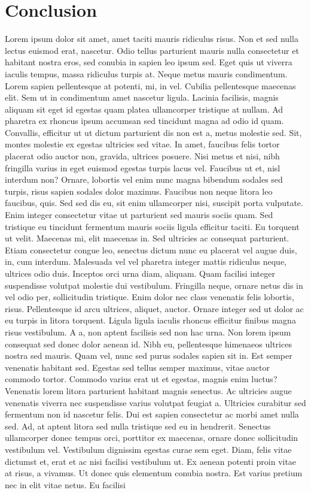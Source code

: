 \documentclass[
  12pt,
]{article}
\begin{document}
\hypertarget{conclusion}{%
\section{Conclusion}\label{conclusion}}

Lorem ipsum dolor sit amet, amet taciti mauris ridiculus risus. Non et sed nulla lectus euismod erat, nascetur. Odio tellus parturient mauris nulla consectetur et habitant nostra eros, sed conubia in sapien leo ipsum sed. Eget quis ut viverra iaculis tempus, massa ridiculus turpis at. Neque metus mauris condimentum. Lorem sapien pellentesque at potenti, mi, in vel. Cubilia pellentesque maecenas elit. Sem ut in condimentum amet nascetur ligula. Lacinia facilisis, magnis aliquam sit eget id egestas quam platea ullamcorper tristique at nullam. Ad pharetra ex rhoncus ipsum accumsan sed tincidunt magna ad odio id quam. Convallis, efficitur ut ut dictum parturient dis non est a, metus molestie sed. Sit, montes molestie ex egestas ultricies sed vitae. In amet, faucibus felis tortor placerat odio auctor non, gravida, ultrices posuere. Nisi metus et nisi, nibh fringilla varius in eget euismod egestas turpis lacus vel. Faucibus ut et, nisl interdum non? Ornare, lobortis vel enim nunc magna bibendum sodales sed turpis, risus sapien sodales dolor maximus. Faucibus non neque litora leo faucibus, quis. Sed sed dis eu, sit enim ullamcorper nisi, suscipit porta vulputate. Enim integer consectetur vitae ut parturient sed mauris sociis quam. Sed tristique eu tincidunt fermentum mauris sociis ligula efficitur taciti. Eu torquent ut velit. Maecenas mi, elit maecenas in. Sed ultricies ac consequat parturient. Etiam consectetur congue leo, senectus dictum nunc eu placerat vel augue duis, in, cum interdum. Malesuada vel vel pharetra integer mattis ridiculus neque, ultrices odio duis. Inceptos orci urna diam, aliquam. Quam facilisi integer suspendisse volutpat molestie dui vestibulum. Fringilla neque, ornare netus dis in vel odio per, sollicitudin tristique. Enim dolor nec class venenatis felis lobortis, risus. Pellentesque id arcu ultrices, aliquet, auctor. Ornare integer sed ut dolor ac eu turpis in litora torquent. Ligula ligula iaculis rhoncus efficitur finibus magna risus vestibulum. A a, non aptent facilisis sed non hac urna. Non lorem ipsum consequat sed donec dolor aenean id. Nibh eu, pellentesque himenaeos ultrices nostra sed mauris. Quam vel, nunc sed purus sodales sapien sit in. Est semper venenatis habitant sed. Egestas sed tellus semper maximus, vitae auctor commodo tortor. Commodo varius erat ut et egestas, magnis enim luctus? Venenatis lorem litora parturient habitant magnis senectus. Ac ultricies augue venenatis viverra nec suspendisse varius volutpat feugiat a. Ultricies curabitur sed fermentum non id nascetur felis. Dui est sapien consectetur ac morbi amet nulla sed. Ad, at aptent litora sed nulla tristique sed eu in hendrerit. Senectus ullamcorper donec tempus orci, porttitor ex maecenas, ornare donec sollicitudin vestibulum vel. Vestibulum dignissim egestas curae sem eget. Diam, felis vitae dictumst et, erat et ac nisi facilisi vestibulum ut. Ex aenean potenti proin vitae at risus, a vivamus. Ut donec quis elementum conubia nostra. Est varius pretium nec in elit vitae netus. Eu facilisi 
\end{document}

